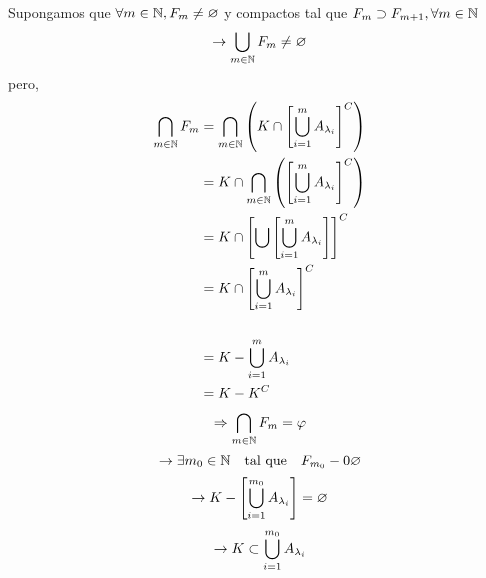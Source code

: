 Supongamos que $\forall m \in \mathbb{N}, F_m \neq \varnothing $ y compactos tal que $F_m \supset F_{m+1}, \forall m \in \mathbb{N}$
$$
	\rightarrow \bigcuplim{m \in \N} F_m  \neq \varnothing
$$
pero,
\begin{align*}
	\bigcaplim{m \in \N} F_m & = \bigcaplim{m \in \N} \pqty{K \cap  \bqty{\bigcuplim{i = 1}{m} A_{\lambda_i}}^C }  \\
	                         & =K \cap \bigcaplim{m \in \N} \pqty{   \bqty{\bigcuplim{i = 1}{m} A_{\lambda_i}}^C } \\
	                         & =K \cap   \bqty{ \bigcup   \bqty{\bigcuplim{i = 1}{m} A_{\lambda_i}} }^C            \\
	                         & =K \cap   \bqty{    \bigcuplim{i = 1}{m} A_{\lambda_i} }^C                          \\\\
	                         & =K - \bigcuplim{i = 1}{m} A_{\lambda_i}                                             \\
	                         & = K-K^C                                                                             \\
\end{align*}
$$
	\Rightarrow \bigcaplim{m \in \N} F_m = \varphi
$$
$$
	\rightarrow \exists m_0 \in \mathbb{N} \quad \text{tal que}\quad F_{m_0} -0 \varnothing
$$
$$
	\rightarrow K- \bqty{\bigcuplim{i = 1}{m_0} A_{\lambda_i}} = \varnothing
$$
$$
	\rightarrow K \subset \bigcuplim{i = 1}{m_0}  A_{\lambda_i}
$$

\thmrpf{}{}{}{}
